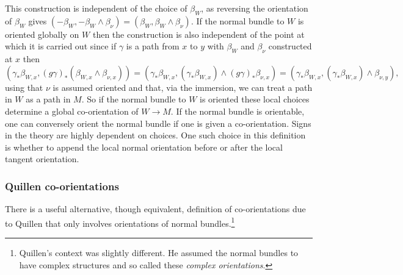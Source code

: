 This construction is independent of the choice of $\beta_W$, as reversing the orientation of $\beta_W$ gives $(-\beta_W, -\beta_W \wedge \beta_\nu)=(\beta_W, \beta_W \wedge \beta_\nu)$. If the normal bundle to $W$ is oriented globally on $W$ then the construction  is also independent of the point at which it is carried out since if $\gamma$ is a path from $x$ to $y$ with $\beta_W$ and $\beta_\nu$ constructed at $x$ then $$(\gamma_*\beta_{W,x},(g\gamma)_* ( \beta_{W,x} \wedge \beta_{\nu,x}))=(\gamma_*\beta_{W,x},(\gamma_* \beta_{W,x}) \wedge(g\gamma)_*\beta_{\nu,x})=(\gamma_*\beta_{W,x},(\gamma_* \beta_{W,x} )\wedge \beta_{\nu,y}),$$ using that $\nu$ is assumed oriented and that, via the immersion, we can treat a path in $W$ as a path in $M$.
So if the normal bundle to $W$ is oriented these local choices determine a global co-orientation of $W\to M$.
If the normal bundle is orientable, one can conversely orient the normal bundle if one is given a co-orientation.   Signs in the theory are highly dependent on choices.  One such choice in this definition is  whether to append the local normal orientation before or after the local tangent orientation.


\subsubsection{Quillen co-orientations} \label{S: Quillen}
There is a useful alternative, though equivalent, definition of co-orientations due to Quillen \cite{Quil71} that only involves orientations of normal bundles.\footnote{Quillen's context was slightly different. He assumed the normal bundles to have complex structures and so called these {\it complex orientations}.}


